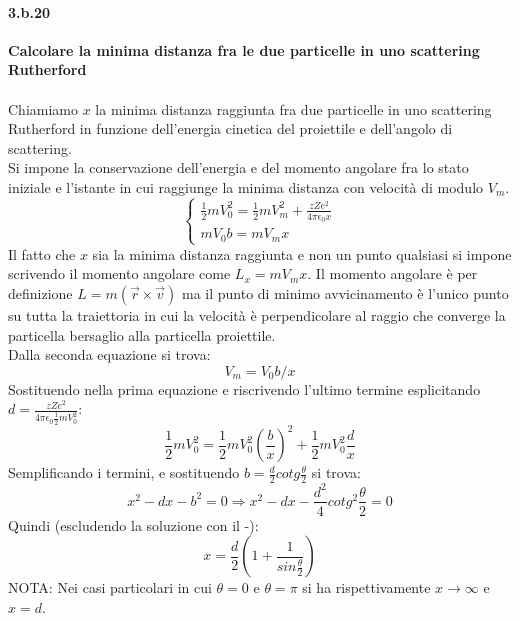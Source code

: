 \documentclass[twoside]{article}
\begin{document}
\paragraph{3.b.20}\textbf{Calcolare la minima distanza fra le due particelle in uno scattering Rutherford}\\
\\
Chiamiamo $x$ la minima distanza raggiunta fra due particelle in uno scattering Rutherford in funzione dell'energia cinetica del proiettile e dell'angolo di scattering.\\
Si impone la conservazione dell'energia e del momento angolare fra lo stato iniziale e l'istante in cui raggiunge la minima distanza con velocità di modulo $V_m$.
\begin{equation}
    \left\{ \begin{array}{lr}
         \frac{1}{2} m V_0^2= \frac{1}{2}m V_m^2+ \frac{zZe^2}{4 \pi \epsilon_0 x}  \\
         mV_0b=mV_mx
    \end{array} \right.
\end{equation}
Il fatto che $x$ sia la minima distanza raggiunta e non un punto qualsiasi si impone scrivendo il momento angolare come $L_x=m V_m x$. Il momento angolare è per definizione $L=m (\vec{r}\times \vec{v})$ ma il punto di minimo avvicinamento è l'unico punto su tutta la traiettoria in cui la velocità è perpendicolare al raggio che converge la particella bersaglio alla particella proiettile.\\

Dalla seconda equazione si trova:
\begin{equation*}
    V_m=V_0b/x
\end{equation*}
Sostituendo nella prima equazione e riscrivendo l'ultimo termine esplicitando $d=\frac{zZe^2}{4 \pi \epsilon_0 \frac{1}{2}m V_0^2}$:
\begin{equation*}
    \frac{1}{2}mV_0^2=\frac{1}{2}m V_0^2 \left(\frac{b}{x}\right)^2 + \frac{1}{2} mV_0^2 \frac{d}{x}
\end{equation*}
Semplificando i termini, e sostituendo $b=\frac{d}{2}cotg\frac{\theta}{2}$ si trova:
\begin{equation*}
    x^2-dx-b^2=0 \Rightarrow x^2-dx-\frac{d^2}{4} cotg^2\frac{\theta}{2}=0
\end{equation*}
Quindi (escludendo la soluzione con il -):
\begin{equation}
    x=\frac{d}{2}\left(1+\frac{1}{sin\frac{\theta}{2}} \right)
\end{equation}
NOTA: Nei casi particolari in cui $\theta=0$ e $\theta=\pi$ si ha rispettivamente $x\rightarrow\infty$ e $x=d$.
\end{document}
